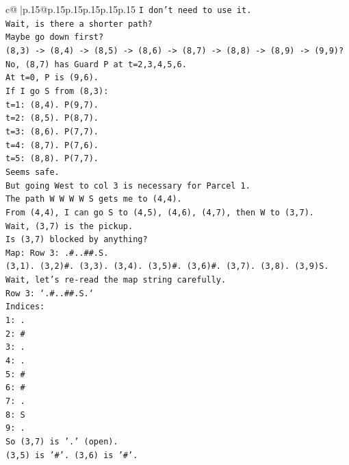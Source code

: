 \documentclass{article}
\begin{document}
{\begin{supertabular}{c@{$\;$}|p{.15\linewidth}@{}p{.15\linewidth}p{.15\linewidth}p{.15\linewidth}p{.15\linewidth}p{.15\linewidth}}
{{{\texttt{I don't need to use it.} \\
\texttt{Wait, is there a shorter path?} \\
\texttt{Maybe go down first?} \\
\texttt{(8,3) {-}> (8,4) {-}> (8,5) {-}> (8,6) {-}> (8,7) {-}> (8,8) {-}> (8,9) {-}> (9,9)?} \\
\texttt{No, (8,7) has Guard P at t=2,3,4,5,6.} \\
\texttt{At t=0, P is (9,6).} \\
\texttt{If I go S from (8,3):} \\
\texttt{t=1: (8,4). P(9,7).} \\
\texttt{t=2: (8,5). P(8,7).} \\
\texttt{t=3: (8,6). P(7,7).} \\
\texttt{t=4: (8,7). P(7,6).} \\
\texttt{t=5: (8,8). P(7,7).} \\
\texttt{Seems safe.} \\
\texttt{But going West to col 3 is necessary for Parcel 1.} \\
\texttt{The path W W W W S gets me to (4,4).} \\
\texttt{From (4,4), I can go S to (4,5), (4,6), (4,7), then W to (3,7).} \\
\texttt{Wait, (3,7) is the pickup.} \\
\texttt{Is (3,7) blocked by anything?} \\
\texttt{Map: Row 3: .\#..\#\#.S.} \\
\texttt{(3,1). (3,2)\#. (3,3). (3,4). (3,5)\#. (3,6)\#. (3,7). (3,8). (3,9)S.} \\
\texttt{Wait, let's re{-}read the map string carefully.} \\
\texttt{Row 3: `.\#..\#\#.S.`} \\
\texttt{Indices:} \\
\texttt{1: .} \\
\texttt{2: \#} \\
\texttt{3: .} \\
\texttt{4: .} \\
\texttt{5: \#} \\
\texttt{6: \#} \\
\texttt{7: .} \\
\texttt{8: S} \\
\texttt{9: .} \\
\texttt{So (3,7) is '.' (open).} \\
\texttt{(3,5) is '\#'. (3,6) is '\#'.} \\
}}}
\end{supertabular}}
\end{document}
